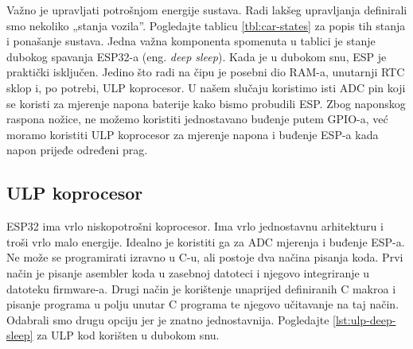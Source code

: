 Važno je upravljati potrošnjom energije sustava. Radi lakšeg upravljanja definirali smo nekoliko „stanja vozila”. 
Pogledajte tablicu \ref{tbl:car-states} za popis tih stanja i ponašanje sustava. 
Jedna važna komponenta spomenuta u tablici je stanje dubokog spavanja ESP32-a (eng. \textit{deep sleep}). 
Kada je u dubokom snu, ESP je praktički isključen. Jedino što radi na čipu je posebni dio RAM-a, unutarnji RTC sklop i, po potrebi, ULP koprocesor. 
U našem slučaju koristimo isti ADC pin koji se koristi za mjerenje napona baterije kako bismo probudili ESP. 
Zbog naponskog raspona nožice, ne možemo koristiti jednostavano buđenje putem GPIO-a, već moramo koristiti ULP koprocesor za mjerenje napona i buđenje ESP-a kada napon prijeđe određeni prag.

\subsection{ULP koprocesor}

ESP32 ima vrlo niskopotrošni koprocesor. Ima vrlo jednostavnu arhitekturu i troši vrlo malo energije. Idealno je koristiti ga za ADC mjerenja i buđenje ESP-a. 
Ne može se programirati izravno u C-u, ali postoje dva načina pisanja koda. 
Prvi način je pisanje asembler koda u zasebnoj datoteci i njegovo integriranje u datoteku firmware-a. 
Drugi način je korištenje unaprijed definiranih C makroa i pisanje programa u polju unutar C programa te njegovo učitavanje na taj način. 
Odabrali smo drugu opciju jer je znatno jednostavnija. Pogledajte \ref{lst:ulp-deep-sleep} za ULP kod korišten u dubokom snu.

